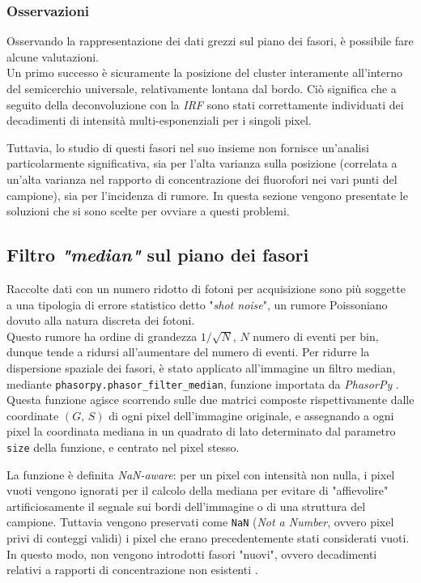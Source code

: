 \subsubsection{Osservazioni}

Osservando la rappresentazione dei dati grezzi sul piano dei fasori, è possibile fare alcune valutazioni.\\
Un primo successo è sicuramente la posizione del cluster interamente all'interno del semicerchio universale, relativamente lontana dal bordo. Ciò significa che a seguito della deconvoluzione con la \textit{IRF} sono stati correttamente individuati dei decadimenti di intensità multi-esponenziali per i singoli pixel.

Tuttavia, lo studio di questi fasori nel suo insieme non fornisce un'analisi particolarmente significativa, sia per l'alta varianza sulla posizione (correlata a un'alta varianza nel rapporto di concentrazione dei fluorofori nei vari punti del campione), sia per l'incidenza di rumore. In questa sezione vengono presentate le soluzioni che si sono scelte per ovviare a questi problemi.



\subsection{Filtro \textit{"median"} sul piano dei fasori}

Raccolte dati con un numero ridotto di fotoni per acquisizione sono più soggette a una tipologia di errore statistico detto "\textit{shot noise}", un rumore Poissoniano dovuto alla natura discreta dei fotoni.\\
Questo rumore ha ordine di grandezza $1/\sqrt{N}$, $N$ numero di eventi per bin, dunque tende a ridursi all'aumentare del numero di eventi. Per ridurre la dispersione spaziale dei fasori, è stato applicato all'immagine un filtro median, mediante \texttt{phasorpy.phasor\_filter\_median}, funzione importata da \textit{PhasorPy} \cite{christophgohlkePhasorpyPhasorpyV0122026}. Questa funzione agisce scorrendo sulle due matrici composte rispettivamente dalle coordinate $(G,\, S)$ di ogni pixel dell'immagine originale, e assegnando a ogni pixel la coordinata mediana in un quadrato di lato determinato dal parametro \texttt{size} della funzione, e centrato nel pixel stesso.

La funzione è definita \textit{NaN-aware}: per un pixel con intensità non nulla, i pixel vuoti vengono ignorati per il calcolo della mediana per evitare di "affievolire" artificiosamente il segnale sui bordi dell'immagine o di una struttura del campione. Tuttavia vengono preservati come \texttt{NaN} (\textit{Not a Number}, ovvero pixel privi di conteggi validi) i pixel che erano precedentemente stati considerati vuoti. In questo modo, non vengono introdotti fasori "nuovi", ovvero decadimenti relativi a rapporti di concentrazione non esistenti \cite{christophgohlkePhasorpyPhasorpyV0122026}.

